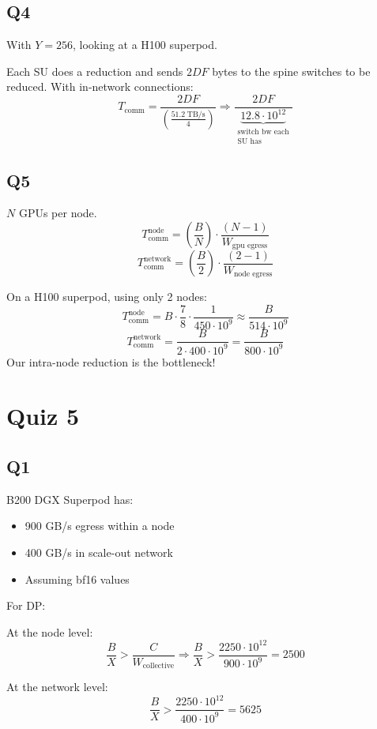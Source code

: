\documentclass[11pt]{article}
\newcommand{\Tcomm}{T_{\text{comm}}}
\newcommand{\Wcoll}{W_{\text{collective}}}
\begin{document}
\subsection*{Q4}

With $Y = 256$, looking at a H100 superpod.

Each SU does a reduction and sends $2DF$ bytes to the spine switches to be reduced. With in-network connections:
\[
\Tcomm = \frac{2DF}{\left(\frac{51.2 \;\text{TB/s}}{4}\right)} \Rightarrow \frac{2DF}{\underbrace{12.8 \cdot 10^{12}}_{\substack{\text{switch bw each}\\ \text{SU has}}}}
\]

\subsection*{Q5}

$N$ GPUs per node.
\[
\Tcomm^{\text{node}} = \left(\frac{B}{N}\right) \cdot \frac{(N-1)}{W_{\text{gpu egress}}}
\]
\[
\Tcomm^{\text{network}} = \left(\frac{B}{2}\right) \cdot \frac{(2-1)}{W_{\text{node egress}}}
\]

On a H100 superpod, using only 2 nodes:
\[
\Tcomm^{\text{node}} = B \cdot \frac{7}{8} \cdot \frac{1}{450 \cdot 10^9} \approx \frac{B}{514 \cdot 10^9}
\]
\[
\Tcomm^{\text{network}} = \frac{B}{2 \cdot 400 \cdot 10^9} = \frac{B}{800 \cdot 10^9}
\]
Our intra-node reduction is the bottleneck!

\section*{Quiz 5}

\subsection*{Q1}

B200 DGX Superpod has:
\begin{itemize}[leftmargin=1.5em]
    \item 900 GB/s egress within a node
    \item 400 GB/s in scale-out network
    \item Assuming bf16 values
\end{itemize}

For DP:

At the node level:
\[
\frac{B}{X} > \frac{C}{\Wcoll} \Rightarrow \frac{B}{X} > \frac{2250 \cdot 10^{12}}{900 \cdot 10^9} = 2500
\]

At the network level:
\[
\frac{B}{X} > \frac{2250 \cdot 10^{12}}{400 \cdot 10^9} = 5625
\]
\end{document}
